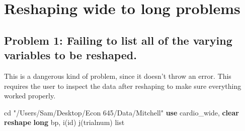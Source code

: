 \documentclass[
]{book}
\newenvironment{Shaded}{\begin{snugshade}}{\end{snugshade}}
\newcommand{\KeywordTok}[1]{\textcolor[rgb]{0.13,0.29,0.53}{\textbf{#1}}}
\newcommand{\NormalTok}[1]{#1}
\newcommand{\OtherTok}[1]{\textcolor[rgb]{0.56,0.35,0.01}{#1}}
\newcommand{\StringTok}[1]{\textcolor[rgb]{0.31,0.60,0.02}{#1}}
\begin{document}
\section{Reshaping wide to long problems}\label{reshaping-wide-to-long-problems}

\subsection*{Problem 1: Failing to list all of the varying variables to be reshaped.}\label{problem-1-failing-to-list-all-of-the-varying-variables-to-be-reshaped.}

This is a dangerous kind of problem, since it doesn't throw an error.
This requires the user to inspect the data after reshaping to make sure
everything worked properly.

\begin{Shaded}
\begin{Highlighting}[]
\NormalTok{cd }\StringTok{"/Users/Sam/Desktop/Econ 645/Data/Mitchell"}
\KeywordTok{use}\NormalTok{ cardio\_wide, }\KeywordTok{clear}
\KeywordTok{reshape} \KeywordTok{long}\NormalTok{ bp, i(id) j(trialnum)}
\OtherTok{list}
\end{Highlighting}
\end{Shaded}
\end{document}
